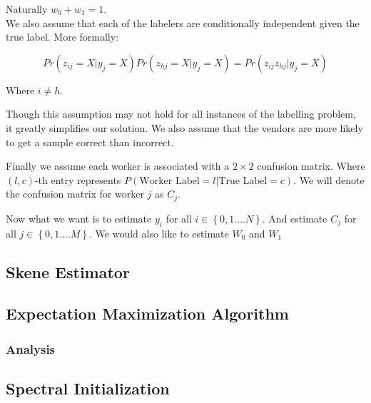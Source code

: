 \documentclass{article}
\begin{document}
Naturally $w_{0} + w_{1} = 1$. \\

We also assume that each of the labelers are conditionally independent given the true label. More formally:

$$Pr(z_{ij} = X | y_{j} = X)Pr(z_{hj} = X | y_{j} = X) = Pr(z_{ij}z_{hj} | y_{j} = X)$$

Where $i \neq h$.

Though this assumption may not hold for all instances of the labelling problem, it greatly simplifies our solution. We also assume that the vendors are more likely to get a sample correct than incorrect.

Finally we assume each worker is associated with a $2 \times 2$ confusion matrix. Where $(l,c)$-th entry represents $P(\text{Worker Label} = l| \text{True Label} = c)$. We will denote the confusion matrix for worker $j$ as  $C_{j}$.

Now what we want is to estimate $y_{i}$ for all $i \in \left\{0,1....N\right\}$. And estimate $C_{j}$ for all $j \in \left\{0,1....M\right\}$. We would also like to estimate $W_{0}$ and $W_{1}$



\subsection{Skene Estimator}


\subsection{Expectation Maximization Algorithm}
\subsubsection{Analysis}

\subsection{Spectral Initialization}













\end{document}
